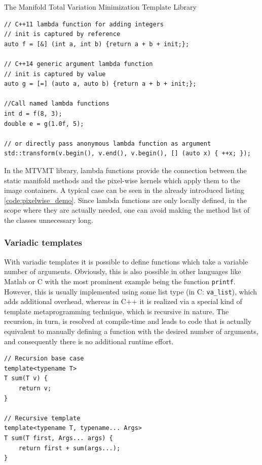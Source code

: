 \begin{chapter}{The Manifold Total Variation Minimization Template Library}
\begin{lstlisting}[label=code:lambdafun,caption={Lambda functions}]
// C++11 lambda function for adding integers
// init is captured by reference
auto f = [&] (int a, int b) {return a + b + init;};

// C++14 generic argument lambda function
// init is captured by value
auto g = [=] (auto a, auto b) {return a + b + init;};

//Call named lambda functions
int d = f(8, 3);
double e = g(1.0f, 5);

// or directly pass anonymous lambda function as argument
std::transform(v.begin(), v.end(), v.begin(), [] (auto x) { ++x; });
\end{lstlisting}

In the MTVMT library, lambda functions provide the connection between the static manifold methods and the pixel-wise kernels which apply them to the image containers.
A typical case can be seen in the already introduced listing \ref{code:pixelwise_demo}. Since lambda functions are only locally defined, in the scope where they are actually needed,
one can avoid making the method list of the classes unnecessary long.

\subsubsection{Variadic templates} %
\label{ssub:Variadic templates}
With variadic templates it is possible to define functions which take a variable number of arguments. Obviously, this is also possible in other languages like Matlab or
C with the most prominent example being the function \texttt{printf}. However, this is usually implemented using some list type (in C: \texttt{va\_list}), which adds additional 
overhead, whereas in C++ it is realized via a special kind of template metaprogramming technique, which is recursive in nature. The recursion, in turn, is resolved at compile-time
and leads to code that is actually equivalent to manually defining a function with the desired number of arguments, and consequently there is no additional runtime effort.\\

\cppinline
\begin{lstlisting}[label=code:variadic,caption={Variadic template example}]
// Recursion base case
template<typename T>
T sum(T v) {
    return v;
}

// Recursive template
template<typename T, typename... Args>
T sum(T first, Args... args) {
    return first + sum(args...);
}
\end{lstlisting}


\end{chapter}
